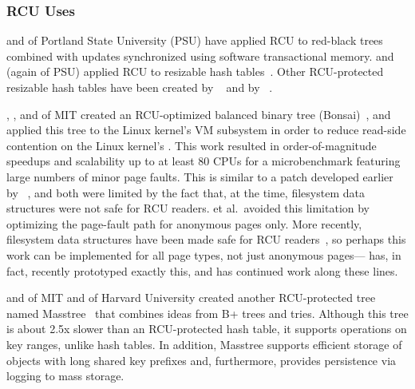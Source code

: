 \subsubsection{RCU Uses}
\label{sec:defer:RCU Uses}

 and  of Portland State University
(PSU) have
applied RCU to red-black
trees~\cite{PhilHowardPhD,PhilHoward2011RCUTMRBTree} combined with updates
synchronized using software transactional memory.
 and  (again of PSU)
applied RCU to resizable
hash tables~\cite{JoshTriplettPhD,Triplett:2011:RPHash,JonCorbet2014RCUhash1,JonCorbet2014RCUhash2}.
Other RCU-protected resizable hash tables have been created by
~\cite{HerbertXu2010RCUResizeHash} and by
~\cite{PaulMcKenney2013LWNURCUhash}.

, , and 
of MIT created an RCU-optimized balanced binary tree
(Bonsai)~\cite{AustinClements2012RCULinux:mmapsem}, and applied this
tree to the Linux kernel's VM subsystem in order to reduce read-side
contention on the Linux kernel's .
This work resulted in order-of-magnitude speedups and scalability up to
at least 80 CPUs for a microbenchmark featuring large numbers of minor
page faults.
This is similar to a patch developed earlier by
~\cite{PeterZijlstra2014SpeculativePageFault}, and both
were limited by the fact that, at the time, filesystem data structures
were not safe for RCU readers.
 et al.\ avoided this limitation by
optimizing the page-fault
path for anonymous pages only.
More recently, filesystem data structures have been made safe for RCU
readers~\cite{JonathanCorbet2010dcacheRCU,JonathanCorbet2011dcacheRCUbug},
so perhaps this work can be implemented for all page types, not just
anonymous pages--- has, in fact, recently prototyped
exactly this, and  has continued work along these lines.

 and  of MIT and  of
Harvard University created another RCU-protected tree named
Masstree~\cite{Mao:2012:CCF:2168836.2168855} that combines ideas from B+
trees and tries.
Although this tree is about 2.5x slower than an RCU-protected hash table,
it supports operations on key ranges, unlike hash tables.
In addition, Masstree supports efficient storage of objects with long
shared key prefixes and, furthermore, provides persistence via logging
to mass storage.

